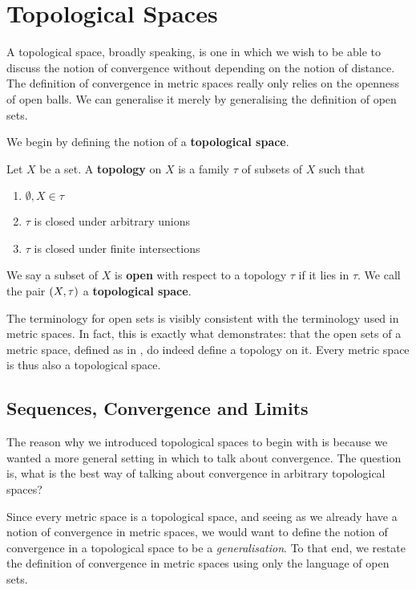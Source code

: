 \section{Topological Spaces}

A topological space, broadly speaking, is one in which we wish to be able to discuss the notion of convergence without depending on the notion of distance. The definition of convergence in metric spaces really only relies on the openness of open balls. We can generalise it merely by generalising the definition of open sets.

We begin by defining the notion of a \textbf{topological space}.

\begin{boxdefinition}
    Let $X$ be a set. A \textbf{topology} on $X$ is a family $\tau$ of subsets of $X$ such that
    \begin{enumerate}
        \item $\emptyset, X \in \tau$
        \item $\tau$ is closed under arbitrary unions
        \item $\tau$ is closed under finite intersections
    \end{enumerate}
    We say a subset of $X$ is \textbf{open} with respect to a topology $\tau$ if it lies in $\tau$. We call the pair $\left( X, \tau \right)$ a \textbf{topological space}.
\end{boxdefinition}

The terminology for open sets is visibly consistent with the terminology used in metric spaces. In fact, this is exactly what  demonstrates: that the open sets of a metric space, defined as in , do indeed define a topology on it. Every metric space is thus also a topological space.

\subsection{Sequences, Convergence and Limits}

The reason why we introduced topological spaces to begin with is because we wanted a more general setting in which to talk about convergence. The question is, what is the best way of talking about convergence in arbitrary topological spaces?

Since every metric space is a topological space, and seeing as we already have a notion of convergence in metric spaces, we would want to define the notion of convergence in a topological space to be a \textit{generalisation}. To that end, we restate the definition of convergence in metric spaces using only the language of open sets.

